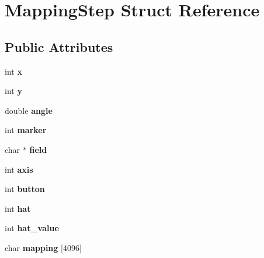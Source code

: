 \hypertarget{structMappingStep}{\section{Mapping\+Step Struct Reference}
\label{structMappingStep}
}
\subsection*{Public Attributes}
\begin{DoxyCompactItemize}
\item 
\hypertarget{structMappingStep_ac122b5c527e4ae777eff7b2bfdde2d49}{int {\bfseries x}}\label{structMappingStep_ac122b5c527e4ae777eff7b2bfdde2d49}

\item 
\hypertarget{structMappingStep_a3a86d7dfdeb19ef69f22ccdf370fec9c}{int {\bfseries y}}\label{structMappingStep_a3a86d7dfdeb19ef69f22ccdf370fec9c}

\item 
\hypertarget{structMappingStep_a574c6544b75cee4daa9b37e327882e9a}{double {\bfseries angle}}\label{structMappingStep_a574c6544b75cee4daa9b37e327882e9a}

\item 
\hypertarget{structMappingStep_ac8229aaee7afea8812b1f086d4102627}{int {\bfseries marker}}\label{structMappingStep_ac8229aaee7afea8812b1f086d4102627}

\item 
\hypertarget{structMappingStep_ad586ab3d773ca3670fb82197cd277357}{char $\ast$ {\bfseries field}}\label{structMappingStep_ad586ab3d773ca3670fb82197cd277357}

\item 
\hypertarget{structMappingStep_abde758906946d0b1fa4e6bbf24673c20}{int {\bfseries axis}}\label{structMappingStep_abde758906946d0b1fa4e6bbf24673c20}

\item 
\hypertarget{structMappingStep_a684bf4169e4d2a91c046470ac7a6f7b7}{int {\bfseries button}}\label{structMappingStep_a684bf4169e4d2a91c046470ac7a6f7b7}

\item 
\hypertarget{structMappingStep_a269b7267c576ad110fa8b6660e31f898}{int {\bfseries hat}}\label{structMappingStep_a269b7267c576ad110fa8b6660e31f898}

\item 
\hypertarget{structMappingStep_a2c608a8521ae6a4c38c241e4d3429221}{int {\bfseries hat\+\_\+value}}\label{structMappingStep_a2c608a8521ae6a4c38c241e4d3429221}

\item 
\hypertarget{structMappingStep_a33042563865c10ae64a1edaa18722ecb}{char {\bfseries mapping} \mbox{[}4096\mbox{]}}\label{structMappingStep_a33042563865c10ae64a1edaa18722ecb}

\end{DoxyCompactItemize}


